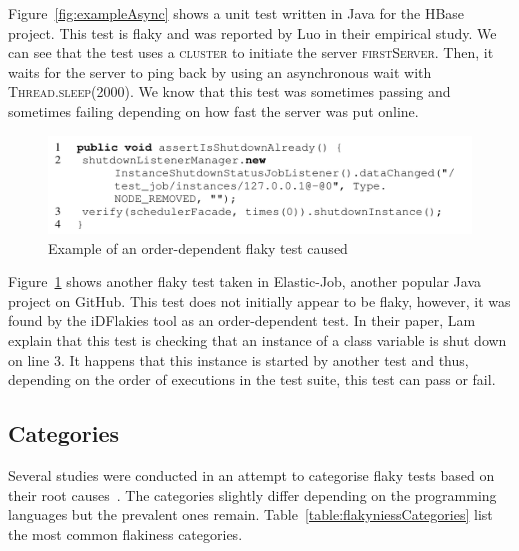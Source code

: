Figure~\ref{fig:exampleAsync} shows a unit test written in Java for the HBase project. This test is flaky and was reported by Luo \etal in their empirical study. We can see that the test uses a \textsc{cluster} to initiate the server \textsc{firstServer}. Then, it waits for the server to ping back by using an asynchronous wait with \textsc{Thread.sleep(2000)}. We know that this test was sometimes passing and sometimes failing depending on how fast the server was put online.


\begin{figure}[ht]
\centering
\includegraphics[width=1\textwidth]{figures/core/exampleOD.png}
\caption{Example of an order-dependent flaky test caused~\cite{Lam2019iDFlakies}}
\label{fig:exampleOD}
\end{figure}

Figure~\ref{fig:exampleOD} shows another flaky test taken in Elastic-Job, another popular Java project on GitHub. This test does not initially appear to be flaky, however, it was found by the iDFlakies tool as an order-dependent test. In their paper, Lam \etal explain that this test is checking that an instance of a class variable is shut down on line 3. It happens that this instance is started by another test and thus, depending on the order of executions in the test suite, this test can pass or fail. 


\subsection{Categories}
Several studies were conducted in an attempt to categorise flaky tests based on their root causes~\cite{parry2022surveying,Luo2014,Gruber2021,Lam2020a,Eck2019}. The categories slightly differ depending on the programming languages but the prevalent ones remain. Table~\ref{table:flakyniessCategories} list the most common flakiness categories.

